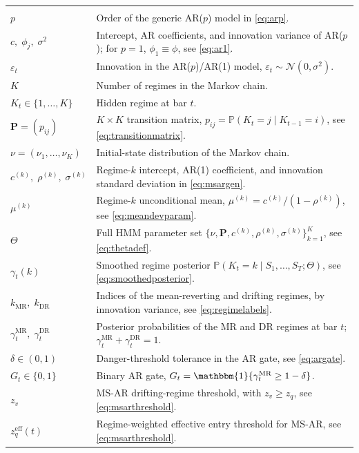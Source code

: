 \begin{longtable}{p{} p{}}
\addlinespace
\multicolumn{2}{@{}l}{\textit{Regime-aware models (Section~\ref{sec:regimemodels}).}}\\
$p$                           & Order of the generic AR($p$) model in \eqref{eq:arp}. \\
$c,\;\phi_j,\;\sigma^{2}$     & Intercept, AR coefficients, and innovation variance of AR($p$); for $p = 1$, $\phi_1 \equiv \phi$, see \eqref{eq:ar1}. \\
$\varepsilon_t$               & Innovation in the AR($p$)/AR(1) model, $\varepsilon_t \sim \mathcal{N}(0,\sigma^{2})$. \\
$K$                           & Number of regimes in the Markov chain. \\
$K_t \in \{1,\ldots,K\}$      & Hidden regime at bar $t$. \\
$\mathbf{P} = (p_{ij})$       & $K \times K$ transition matrix, $p_{ij} = \mathbb{P}(K_t = j \mid K_{t-1} = i)$, see \eqref{eq:transitionmatrix}. \\
$\nu = (\nu_1,\ldots,\nu_K)$  & Initial-state distribution of the Markov chain. \\
$c^{(k)},\;\rho^{(k)},\;\sigma^{(k)}$ & Regime-$k$ intercept, AR(1) coefficient, and innovation standard deviation in \eqref{eq:msargen}. \\
$\mu^{(k)}$                   & Regime-$k$ unconditional mean, $\mu^{(k)} = c^{(k)}/(1-\rho^{(k)})$, see \eqref{eq:meandevparam}. \\
$\Theta$                      & Full HMM parameter set $\{\nu, \mathbf{P}, c^{(k)}, \rho^{(k)}, \sigma^{(k)}\}_{k=1}^{K}$, see \eqref{eq:thetadef}. \\
$\gamma_t(k)$                 & Smoothed regime posterior $\mathbb{P}(K_t = k \mid S_1,\ldots,S_T;\Theta)$, see \eqref{eq:smoothedposterior}. \\
$k_{\mathrm{MR}},\;k_{\mathrm{DR}}$ & Indices of the mean-reverting and drifting regimes, by innovation variance, see \eqref{eq:regimelabels}. \\
$\gamma_t^{\mathrm{MR}},\;\gamma_t^{\mathrm{DR}}$ & Posterior probabilities of the MR and DR regimes at bar $t$; $\gamma_t^{\mathrm{MR}} + \gamma_t^{\mathrm{DR}} = 1$. \\
$\delta \in (0,1)$            & Danger-threshold tolerance in the AR gate, see \eqref{eq:argate}. \\
$G_t \in \{0, 1\}$            & Binary AR gate, $G_t = \mathbbm{1}\{\gamma_t^{\mathrm{MR}} \geq 1-\delta\}$. \\
$z_v$                         & MS-AR drifting-regime threshold, with $z_v \geq z_q$, see \eqref{eq:msarthreshold}. \\
$z_q^{\mathrm{eff}}(t)$       & Regime-weighted effective entry threshold for MS-AR, see \eqref{eq:msarthreshold}. \\


\end{longtable}

